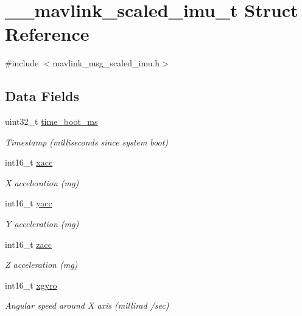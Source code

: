 \hypertarget{struct____mavlink__scaled__imu__t}{\section{\+\_\+\+\_\+mavlink\+\_\+scaled\+\_\+imu\+\_\+t Struct Reference}
\label{struct____mavlink__scaled__imu__t}
}


{\ttfamily \#include $<$mavlink\+\_\+msg\+\_\+scaled\+\_\+imu.\+h$>$}

\subsection*{Data Fields}
\begin{DoxyCompactItemize}
\item 
uint32\+\_\+t \hyperlink{struct____mavlink__scaled__imu__t_a3bdcf7dc969ea7ca67657b1420652468}{time\+\_\+boot\+\_\+ms}
\begin{DoxyCompactList}\small\item\em Timestamp (milliseconds since system boot) \end{DoxyCompactList}\item 
int16\+\_\+t \hyperlink{struct____mavlink__scaled__imu__t_a2fe0911cd27268449b437b15d5bc8ab7}{xacc}
\begin{DoxyCompactList}\small\item\em X acceleration (mg) \end{DoxyCompactList}\item 
int16\+\_\+t \hyperlink{struct____mavlink__scaled__imu__t_aa3c8baf85a0087a26c7be8d2203744f8}{yacc}
\begin{DoxyCompactList}\small\item\em Y acceleration (mg) \end{DoxyCompactList}\item 
int16\+\_\+t \hyperlink{struct____mavlink__scaled__imu__t_aa7263339399089b12c2874278033a5a1}{zacc}
\begin{DoxyCompactList}\small\item\em Z acceleration (mg) \end{DoxyCompactList}\item 
int16\+\_\+t \hyperlink{struct____mavlink__scaled__imu__t_aed9c79287653e608e2eef8b904189fae}{xgyro}
\begin{DoxyCompactList}\small\item\em Angular speed around X axis (millirad /sec) \end{DoxyCompactList}\item 

\end{DoxyCompactItemize}
